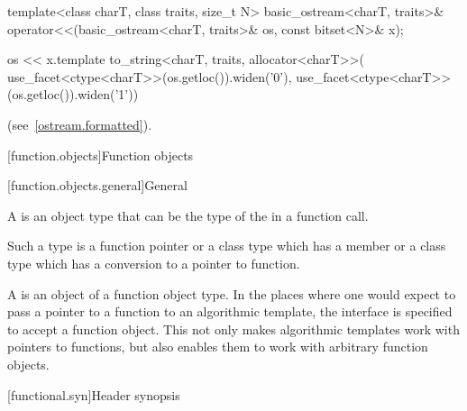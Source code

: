 %
\begin{itemdecl}
template<class charT, class traits, size_t N>
  basic_ostream<charT, traits>&
    operator<<(basic_ostream<charT, traits>& os, const bitset<N>& x);
\end{itemdecl}

\begin{itemdescr}
\pnum
\returns
\begin{codeblock}
os << x.template to_string<charT, traits, allocator<charT>>(
  use_facet<ctype<charT>>(os.getloc()).widen('0'),
  use_facet<ctype<charT>>(os.getloc()).widen('1'))
\end{codeblock}
(see~\ref{ostream.formatted}).
\end{itemdescr}

[function.objects]{Function objects}

[function.objects.general]{General}

\pnum
A  is an object
type that can be the type of the
in a function call.
\begin{footnote}
Such a type is a function
pointer or a class type which has a member  or a class type
which has a conversion to a pointer to function.
\end{footnote}
A  is an
object of a function object type. In the places where one would expect to pass a
pointer to a function to an algorithmic template, the
interface is specified to accept a function object. This not only makes
algorithmic templates work with pointers to functions, but also enables them to
work with arbitrary function objects.

[functional.syn]{Header  synopsis}

